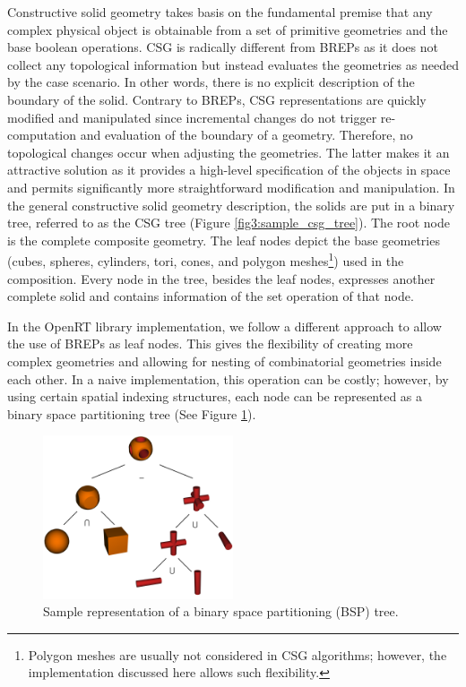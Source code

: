 \documentclass[a4paper,11pt,oneside]{article}
\begin{document}
Constructive solid geometry takes basis on the fundamental premise that any complex physical object is obtainable from a set of primitive geometries and the base boolean operations. CSG is radically different from BREPs as it does not collect any topological information but instead evaluates the geometries as needed by the case scenario. In other words, there is no explicit description of the boundary of the solid. Contrary to BREPs,  CSG representations are quickly modified and manipulated since incremental changes do not trigger re-computation and evaluation of the boundary of a geometry. Therefore, no topological changes occur when adjusting the geometries. The latter makes it an attractive solution as it provides a high-level specification of the objects in space and permits significantly more straightforward modification and manipulation. In the general constructive solid geometry description, the solids are put in a binary tree, referred to as the CSG tree (Figure \ref{fig3:sample_csg_tree}). The root node is the complete composite geometry. The leaf nodes depict the base geometries (cubes, spheres, cylinders, tori, cones, and polygon meshes\footnote{Polygon meshes are usually not considered in CSG algorithms; however, the implementation discussed here allows such flexibility.}) used in the composition. Every node in the tree, besides the leaf nodes, expresses another complete solid and contains information of the set operation of that node.
    
In the OpenRT library implementation, we follow a different approach to allow the use of BREPs as leaf nodes. This gives the flexibility of creating more complex geometries and allowing for nesting of combinatorial geometries inside each other. In a naive implementation, this operation can be costly; however, by using certain spatial indexing structures, each node can be represented as a binary space partitioning tree (See Figure \ref{fig4:sample_bsp_tree}).
  
\begin{figure}[ht]
	\begin{center}
		\includegraphics[width=0.5\textwidth]{section1/sample-csg-tree.png}
	\end{center}
	\caption{Sample representation of a binary space partitioning (BSP) tree.}
	\label{fig4:sample_bsp_tree}
\end{figure}
  
\end{document}
